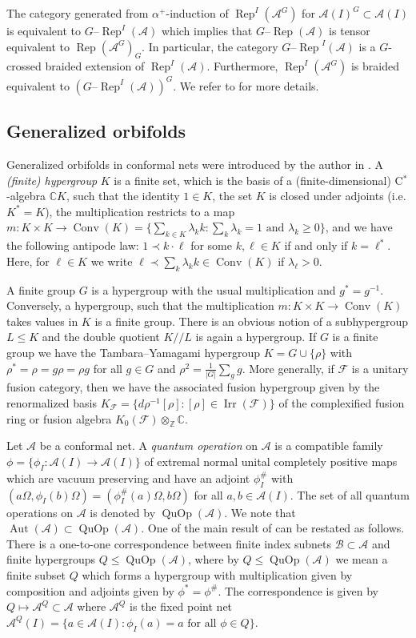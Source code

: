 \documentclass[twoside,11pt,reqno]{amsart}
\makeatletter
\theoremstyle{definition}
\theoremstyle{remark}
\newcommand{\cF}{\mathcal{F}}
\newcommand{\cB}{\mathcal{B}}
\newcommand{\A}{\mathcal{A}}
\newcommand{\CC}{\mathbb{C}}
\newcommand{\ZZ}{\mathbb{Z}}
\DeclareMathOperator{\Rep}{Rep}
\DeclareMathOperator{\Aut}{Aut}
\DeclareRobustCommand{\ie}{i.e.\@\xspace}
\DeclareMathOperator{\Conv}{Conv}
\DeclareMathOperator{\QuOp}{QuOp}
\DeclareMathOperator{\Irr}{Irr}
\newcommand{\tRep}[1]{#1\text{--}\Rep}
\newcommand{\CS}{/\!/}
\newcommand{\myemph}[1]{\emph{#1}}
\makeatother
\begin{document}
The category generated from $\alpha^+$-induction of $\Rep^I(\A^G)$ 
for $\A(I)^G \subset \A(I)$ is equivalent to $\tRep{G}^I(\A)$ which implies that 
${\tRep G}(\A)$ is tensor equivalent to $\Rep(\A^G)_G$.
In particular, the category ${\tRep G}^I(\A)$ is a 
$G$-crossed braided extension of $\Rep^I(\A)$.
Furthermore, $\Rep^I(\A^G)$ is braided equivalent to $(\tRep G^I(\A))^G$.
We refer to \cite{Mg2005} for more details.

\subsection{Generalized orbifolds}
Generalized orbifolds in conformal nets were introduced by the author 
in \cite{Bi2016}. 
A \myemph{(finite) hypergroup} $K$ is a finite set, 
which is the basis of a (finite-dimensional) C${}^\ast$-algebra $\CC K$,
such that the identity $1\in K$, the set $K$ is closed under adjoints 
(\ie $K^\ast= K$),
the multiplication restricts to a map 
$m\colon K\times K \to \Conv(K)=\{\sum_{k\in K}\lambda_k k: 
\sum_k\lambda_k=1 \text{ and } \lambda_k\geq 0\}$, and we 
 have the following antipode law:
 $1\prec k\cdot \ell$ for some $k,\ell \in K$ if and only if 
$k=\ell^\ast$.
Here, for $\ell\in K$ we write 
$\ell \prec \sum_k\lambda_k k\in \Conv(K)$ if $\lambda_\ell >0$.

A finite group $G$ is a hypergroup with the usual multiplication and
$g^\ast = g^{-1}$.
Conversely, a hypergroup, such that the multiplication $m\colon K\times K\to\Conv(K)$ takes values in $K$ is a finite group. 
There is an obvious notion of a subhypergroup $L\leq K$ and 
the double quotient $K\CS L$ is again a hypergroup.
If $G$ is a finite group we have the Tambara--Yamagami hypergroup
$K=G\cup \{\rho\}$ with $\rho^\ast=\rho=g\rho=\rho g$ for all $g\in G$ 
and $\rho^2=\frac{1}{|G|}\sum_g g$.
More generally, if $\cF$ is a unitary fusion category, then we have
the associated fusion hypergroup given by the renormalized basis
$K_\cF=\{d\rho^{-1}[\rho] :[\rho]\in \Irr(\cF)\}$ of the 
complexified fusion ring or fusion algebra $K_0(\cF)\otimes_\ZZ\CC$.

Let $\A$ be a conformal net. 
A \myemph{quantum operation} on $\A$ is a compatible family 
$\phi=\{\phi_I\colon \A(I)\to\A(I)\}$ of 
extremal normal unital completely positive maps which are vacuum preserving
and have an adjoint $\phi_I^\#$ with $(a\Omega,\phi_I(b)\Omega)=
(\phi_I^\#(a)\Omega,b\Omega)$ for all $a,b\in\A(I)$. 
The set of all quantum operations on $\A$ is denoted by $\QuOp(\A)$.
We note that $\Aut(\A)\subset\QuOp(\A)$.
One of the main result of \cite{Bi2016} can be restated as follows.
There is a one-to-one correspondence between finite index subnets 
$\cB\subset \A$ and finite hypergroups $Q\leq \QuOp(\A)$, where by 
$Q\leq \QuOp(\A)$ we mean a finite subset $Q$ which forms a hypergroup with multiplication
given by composition and adjoints given by $\phi^\ast= \phi^\#$.
The correspondence is given by $Q\mapsto \A^Q\subset\A$
where $\A^Q$ is the fixed point net 
$\A^Q(I)=\{a\in\A(I):\phi_I(a)=a \text{ for all }\phi\in Q\}$. 
\end{document}
